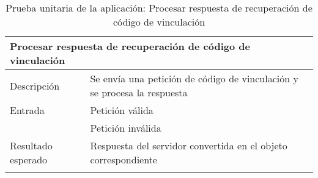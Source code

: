 \begin{longtable}{|p{} p{}|}
    \hline
    \multicolumn{2}{|l|}{\textbf{Procesar respuesta de recuperación de código de vinculación}} \\ \hline 
    Descripción                 & Se envía una petición de código de vinculación y se procesa la respuesta \\ \hline
    Entrada                     & Petición válida \\
                                & Petición inválida \\ \hline
    Resultado esperado          & Respuesta del servidor convertida en el objeto correspondiente \\ \hline
    \caption{Prueba unitaria de la aplicación: Procesar respuesta de recuperación de código de vinculación}
    \label{cp:u:app:respuesta_recuperacion_codigo_vinculacion}
\end{longtable}